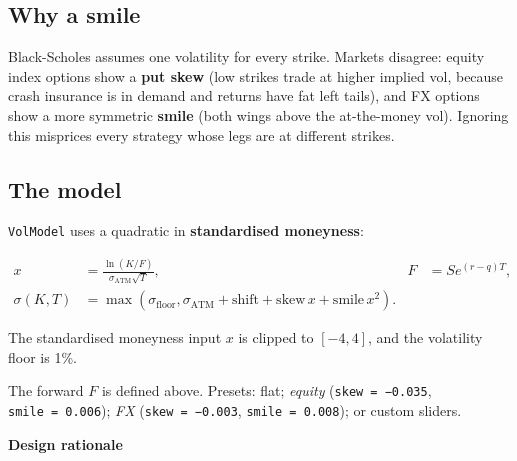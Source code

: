 \documentclass[10pt,a4paper]{article}
\numberwithin{equation}{section}
\begin{document}
\subsection{Why a smile}\label{why-a-smile}

Black-Scholes assumes one volatility for every strike. Markets disagree: equity index options show a \textbf{put skew} (low strikes trade at higher implied vol, because crash insurance is in demand and returns have fat left tails), and FX options show a more symmetric \textbf{smile} (both wings above the at-the-money vol). Ignoring this misprices every strategy whose legs are at different strikes.

\subsection{The model}\label{the-model}

\texttt{VolModel} uses a quadratic in \textbf{standardised moneyness}:

\begin{align}
x &= \frac{\ln(K/F)}{\sigma_{\mathrm{ATM}}\sqrt{T}}, & F &= Se^{(r-q)T},\\
\sigma(K,T)&=\max\!\left(\sigma_{\mathrm{floor}},\sigma_{\mathrm{ATM}}+
\mathrm{shift}+\mathrm{skew}\,x+\mathrm{smile}\,x^2\right).
\end{align}

The standardised moneyness input \(x\) is clipped to \([-4,4]\), and the volatility floor is 1\%.

The forward \(F\) is defined above. Presets: flat; \emph{equity} (\texttt{skew\ =\ −0.035}, \texttt{smile\ =\ 0.006}); \emph{FX} (\texttt{skew\ =\ −0.003}, \texttt{smile\ =\ 0.008}); or custom sliders.

\textbf{Design rationale}
\end{document}
